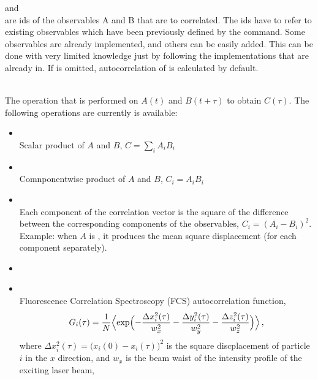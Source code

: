 \begin{arguments}
\item {} and  \\ 
  are ids of the observables A and B that are to correlated. The ids have to refer to existing 
  observables which have been previously defined by the  command.
  Some observables are already implemented, and others can be easily added. This can be done
  with very limited \es{} knowledge just by following the implementations that are already
  in. If  is omitted, autocorrelation of  is calculated by default.
\item {} \\
  The operation that is performed on $A(t)$ and $B(t+\tau)$ to obtain $C(\tau)$. 
  The following operations are currently is available:
  \begin{itemize}
    \item {} \\
    Scalar product of $A$ and $B$, \ie $C=\sum\limits_{i} A_i B_i$
    \item {} \\
    Comnponentwise product of $A$ and $B$, \ie $C_i = A_i B_i$
    \item {} \\
    Each component of the correlation vector is the square of the difference between the 
    corresponding components of the observables, \ie $C_i = (A_i-B_i)^2$. 
    Example: when $A$ is , it produces the mean square displacement
    (for each component separately).
    \item {}
    \item {}   \\
    Fluorescence Correlation Spectroscopy (FCS) autocorrelation function, \ie
    \begin{equation}
    G_i(\tau) = \frac{1}{N} \Bigl< \exp \Bigl( - \frac{\Delta x_i^2(\tau) }{w_x^2} - \frac{\Delta y_i^2(\tau)}{w_y^2} - \frac{\Delta z_i^2(\tau)}{w_z^2} \Bigr) \Bigr>\,,
    \label{eq:Gtau}
    \end{equation}
    where $\Delta x_i^2(\tau) = \bigl(x_i(0) - x_i(\tau) \bigr)^2$ is the square discplacement 
    of particle $i$ in the $x$ direction, and $w_x$ is the beam waist of the intensity profile 
    of the exciting laser beam,
    \begin{equation}

\end{equation}
\end{itemize}
\end{arguments}
